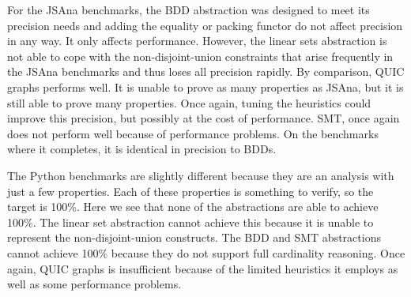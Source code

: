 For the JSAna benchmarks, the BDD abstraction was designed to meet its precision needs and adding the equality or packing functor do not affect precision in any way.  It only affects performance.  However, the linear sets abstraction is not able to cope with the non-disjoint-union constraints that arise frequently in the JSAna benchmarks and thus loses all precision rapidly.  By comparison, QUIC graphs performs well.  It is unable to prove as many properties as JSAna, but it is still able to prove many properties.  Once again, tuning the heuristics could improve this precision, but possibly at the cost of performance.  SMT, once again does not perform well because of performance problems.  On the benchmarks where it completes, it is identical in precision to BDDs.

The Python benchmarks are slightly different because they are an analysis with just a few properties.  Each of these properties is something to verify, so the target is 100\%.  Here we see that none of the abstractions are able to achieve 100\%.  The linear set abstraction cannot achieve this because it is unable to represent the non-disjoint-union constructs.  The BDD and SMT abstractions cannot achieve 100\% because they do not support full cardinality reasoning.  Once again, QUIC graphs is insufficient because of the limited heuristics it employs as well as some performance problems.

